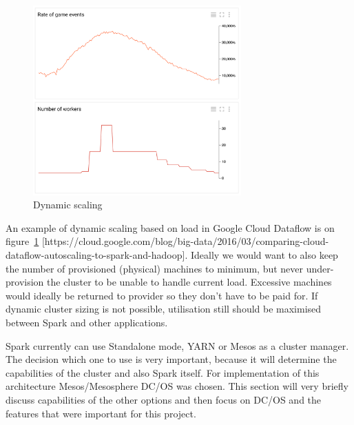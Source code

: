 \documentclass[a4paper, 10 pt, conference]{IEEEtran}
\begin{document}
\begin{figure}[hb]
	\begin{center}
		\caption{Dynamic scaling}
		\label{fig:dynamicScaling}
		\includegraphics[width=8cm,keepaspectratio]{comparing-s-h-14.png}
	\end{center}
\end{figure}

An example of dynamic scaling based on load in Google Cloud Dataflow is on figure~\ref{fig:dynamicScaling} [https://cloud.google.com/blog/big-data/2016/03/comparing-cloud-dataflow-autoscaling-to-spark-and-hadoop]. Ideally we would want to also keep the number of provisioned (physical) machines to minimum, but never under-provision the cluster to be unable to handle current load. Excessive machines would ideally be returned to provider so they don't have to be paid for. If dynamic cluster sizing is not possible, utilisation still should be maximised between Spark and other applications.

Spark currently can use Standalone mode, YARN or Mesos as a cluster manager. The decision which one to use is very important, because it will determine the capabilities of the cluster and also Spark itself. For implementation of this architecture Mesos/Mesosphere DC/OS was chosen. This section will very briefly discuss capabilities of the other options and then focus on DC/OS and the features that were important for this project.
\end{document}
